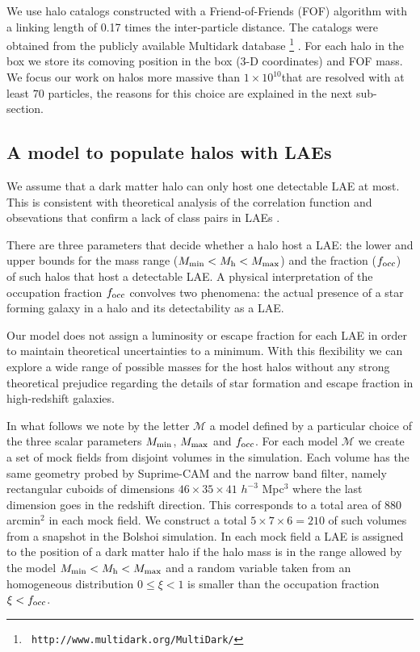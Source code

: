 \documentclass{emulateapj}
\newcommand{\ly}{{\ifmmode{{\rm Ly}\alpha}\else{Ly$\alpha$~}\fi}}
\newcommand{\hMsun}{{\ifmmode{h^{-1}{\rm
        {M_{\odot}}}}\else{$h^{-1}{\rm{M_{\odot}}}$}\fi}}
\begin{document}
We use halo catalogs constructed with a Friend-of-Friends (FOF)
algorithm with a linking length of 0.17 times the inter-particle
distance. The catalogs were obtained from the publicly available
Multidark database \footnote{{\tt
    http://www.multidark.org/MultiDark/}}
\citep{MultiDark}. For each halo in the box we store its
comoving position in the box (3-D coordinates) and FOF mass. We focus our work
on halos more massive than $1\times 10^{10}$\hMsun that are resolved
with at least $70$ particles, the reasons for this choice are
explained in the next sub-section.  


\subsection{A model to populate halos with LAEs}
\label{subsec:mocks}


We assume that a dark matter halo can only host one
detectable LAE at most.  This is consistent with theoretical analysis
of the correlation function \citep{Jose2013b} and obsevations that
confirm a lack of class pairs in LAEs \cite{Bond2009}.

There are three parameters that decide whether a halo host a LAE: the
lower and upper bounds for the mass range ($M_{\rm min}< M_{\rm h} < M_{\rm max}$) 
and the fraction ($f_{\rm occ}$) of such halos that host a detectable
LAE. A physical interpretation of the occupation fraction $f_{\rm
  occ}$ convolves two phenomena: the actual presence of a star forming
galaxy in a halo and its detectability as a LAE.  


Our model does not assign a luminosity or escape fraction for each
LAE in order to maintain theoretical uncertainties to a minimum. With
this flexibility we can explore a wide range of possible masses for
the host halos without any strong theoretical prejudice regarding the
details of star formation and \ly escape fraction in high-redshift
galaxies.  


In what follows we note by the letter ${\mathcal M}$ a model
defined by a particular choice of the three scalar parameters $M_{\rm
  min}$, $M_{\rm  max}$ and $f_{\rm occ}$. For each model ${\mathcal
  M}$ we create a set of mock fields from disjoint volumes in the
simulation. Each volume has the same geometry probed by Suprime-CAM
and the narrow band filter, namely rectangular cuboids of dimensions
$46\times 35\times 41$ $h^{-3}$ Mpc$^{3}$ where the last dimension goes
in the redshift direction. This corresponds to a total area of $880$
arcmin$^{2}$ in each mock field. We construct a total $5\times 7
\times 6=210$ of such volumes from a snapshot in the Bolshoi
simulation. In each mock field a LAE is assigned to the position of a
dark matter halo if the halo mass is in the range allowed by the model
$M_{\rm min}<M_{\rm h}<M_{\rm max}$ and a random variable taken from
an homogeneous distribution $0\leq \xi<1$ is smaller than the occupation
fraction $\xi<f_{\rm occ}$.
\end{document}
